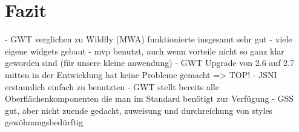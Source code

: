 \section{Fazit}

- GWT verglichen zu Wildfly (MWA) funktionierte insgesamt sehr gut
- viele eigene widgets gebaut
- mvp benutzt, auch wenn vorteile nicht so ganz klar geworden sind (für unsere kleine anwendung)
- GWT Upgrade von 2.6 auf 2.7 mitten in der Entwicklung hat keine Probleme gemacht => TOP!
- JSNI erstaunlich einfach zu benutzten
- GWT stellt bereits alle Oberflächenkomponenten die man im Standard benötigt zur Verfügung
- GSS gut, aber nicht zuende gedacht, zuweisung und durchreichung von styles gewöhnungsbedürftig
